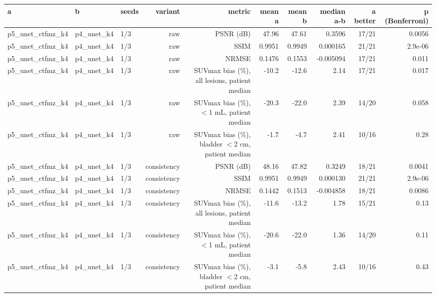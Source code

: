 \begin{tabular}{lllrrrrrrr}
\toprule
a & b & seeds & variant & metric & mean a & mean b & median a-b & a better & p (Bonferroni) \\
\midrule
p5\_unet\_ctfmz\_k4 & p4\_unet\_k4 & 1/3 & raw & PSNR (dB) & 47.96 & 47.61 & 0.3596 & 17/21 & 0.0056 \\
p5\_unet\_ctfmz\_k4 & p4\_unet\_k4 & 1/3 & raw & SSIM & 0.9951 & 0.9949 & 0.000165 & 21/21 & 2.9e-06 \\
p5\_unet\_ctfmz\_k4 & p4\_unet\_k4 & 1/3 & raw & NRMSE & 0.1476 & 0.1553 & -0.005094 & 17/21 & 0.011 \\
p5\_unet\_ctfmz\_k4 & p4\_unet\_k4 & 1/3 & raw & SUVmax bias (\%), all lesions, patient median & -10.2 & -12.6 & 2.14 & 17/21 & 0.017 \\
p5\_unet\_ctfmz\_k4 & p4\_unet\_k4 & 1/3 & raw & SUVmax bias (\%), $<$1 mL, patient median & -20.3 & -22.0 & 2.39 & 14/20 & 0.058 \\
p5\_unet\_ctfmz\_k4 & p4\_unet\_k4 & 1/3 & raw & SUVmax bias (\%), bladder $<$2 cm, patient median & -1.7 & -4.7 & 2.41 & 10/16 & 0.28 \\
p5\_unet\_ctfmz\_k4 & p4\_unet\_k4 & 1/3 & consistency & PSNR (dB) & 48.16 & 47.82 & 0.3249 & 18/21 & 0.0041 \\
p5\_unet\_ctfmz\_k4 & p4\_unet\_k4 & 1/3 & consistency & SSIM & 0.9951 & 0.9949 & 0.000130 & 21/21 & 2.9e-06 \\
p5\_unet\_ctfmz\_k4 & p4\_unet\_k4 & 1/3 & consistency & NRMSE & 0.1442 & 0.1513 & -0.004858 & 18/21 & 0.0086 \\
p5\_unet\_ctfmz\_k4 & p4\_unet\_k4 & 1/3 & consistency & SUVmax bias (\%), all lesions, patient median & -11.6 & -13.2 & 1.78 & 15/21 & 0.13 \\
p5\_unet\_ctfmz\_k4 & p4\_unet\_k4 & 1/3 & consistency & SUVmax bias (\%), $<$1 mL, patient median & -20.6 & -22.0 & 1.36 & 14/20 & 0.11 \\
p5\_unet\_ctfmz\_k4 & p4\_unet\_k4 & 1/3 & consistency & SUVmax bias (\%), bladder $<$2 cm, patient median & -3.1 & -5.8 & 2.43 & 10/16 & 0.43 \\
\bottomrule
\end{tabular}
